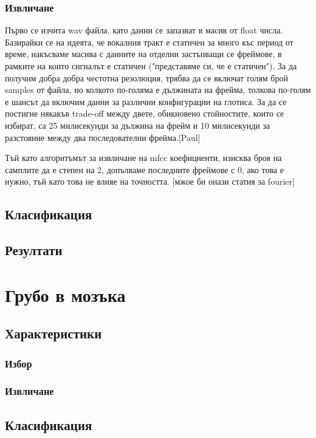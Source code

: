 \documentclass[12pt]{report}
\numberwithin{equation}{section}
\numberwithin{figure}{section}
\begin{document}
    \subsection{Извличане}
        Първо се изчита wav файла, като данни се запазват в масив от float числа.
        Базирайки се на идеята, че вокалния тракт е статичен за много къс период от време,
        накъсваме масива с данните на отделни застъпващи се фреймове, в рамките на които сигналът е статичен ("представяме си, че е статичен"). За да получим добра
        добра честотна резолюция, трябва да се включат голям брой samples от файла, но колкото по-голяма е дължината
        на фрейма, толкова по-голям е шансът да включим данни за различни конфигурации на глотиса.
        За да се постигне някакъв trade-off между двете, обикновено стойностите, които се избират, са 
        25 милисекунди за дължина на фрейм и 10 милисекунди за разстояние между два последователни фрейма.[Paul]
        
        Тъй като алгоритъмът за извличане на mfcc коефициенти, изисква броя на самплите да е степен на 2,
        допълваме последните фреймове с 0, ако това е нужно, тъй като това не влияе на точността. [мжое би онази статия за fourier]

    \section{Класификация}    
    \section{Резултати}

\chapter{Грубо в мозъка}
    \section{Характеристики}
        \subsection{Избор}
        \subsection{Извличане}
    \section{Класификация}    
\end{document}
